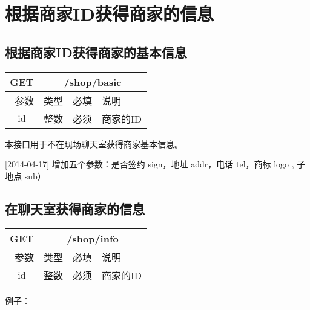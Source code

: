 \documentclass[cs4size]{ctexartutf8}
\begin{document}
\section{根据商家ID获得商家的信息}

\subsection{根据商家ID获得商家的基本信息}

\begin{table}[H]
   \begin{center}
\begin{tabular}{|c|c|c|p{12cm}|}
\hline
GET & \multicolumn{3}{|c|}{/shop/basic} \\
\hline\hline
 \  参数  & 类型 & 必填 &  说明  \\
\hline
 id  & 整数 & 必须 & 商家的ID\\
\hline
\end{tabular}
   \end{center}
\end{table}
本接口用于不在现场聊天室获得商家基本信息。

[2014-04-17] 增加五个参数：是否签约 sign，地址 addr，电话 tel，商标 logo , 子地点 sub）

\subsection{在聊天室获得商家的信息}

\begin{table}[H]
   \begin{center}
\begin{tabular}{|c|c|c|p{12cm}|}
\hline
GET & \multicolumn{3}{|c|}{/shop/info} \\
\hline\hline
 \  参数  & 类型 & 必填 &  说明  \\
\hline
 id  & 整数 & 必须 & 商家的ID\\
\hline
\end{tabular}
   \end{center}
\end{table}

例子：
\end{document}
